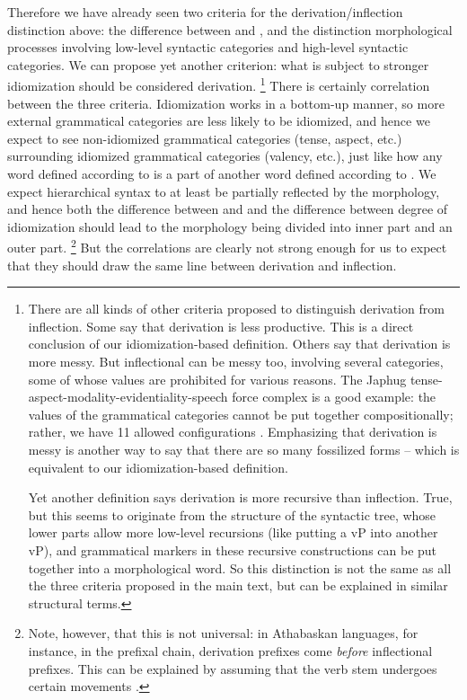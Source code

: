\documentclass[a4paper, oneside, scheme=plain, 12pt]{article}
\newcommand*{\citepage}[1]{p.~{#1}}
\begin{document}
Therefore we have already seen two criteria for the derivation/inflection distinction above:
the difference between  and ,
and the distinction morphological processes involving low-level syntactic categories and high-level syntactic categories.
We can propose yet another criterion:
what is subject to stronger idiomization should be considered derivation.%
\footnote{
    There are all kinds of other criteria proposed to distinguish derivation from inflection.
    Some say that derivation is less productive.
    This is a direct conclusion of our idiomization-based definition.
    Others say that derivation is more messy.
    But inflectional can be messy too,
    involving several categories, some of whose values are prohibited for various reasons.
    The Japhug tense-aspect-modality-evidentiality-speech force complex is a good example:
    the values of the grammatical categories cannot be put together compositionally;
    rather, we have 11 allowed configurations \citep[\citepage{1082}]{jacques2021grammar}.
    Emphasizing that derivation is messy is another way to say that there are so many fossilized forms --
    which is equivalent to our idiomization-based definition.
    
    Yet another definition says derivation is more recursive than inflection.
    True, but this seems to originate from the structure of the syntactic tree,
    whose lower parts allow more low-level recursions (like putting a vP into another vP),
    and grammatical markers in these recursive constructions can be put together into a morphological word.
    So this distinction is not the same as all the three criteria proposed in the main text,
    but can be explained in similar structural terms.
}
There is certainly correlation between the three criteria.
Idiomization works in a bottom-up manner,
so more external grammatical categories are less likely to be idiomized,
and hence we expect to see non-idiomized grammatical categories (tense, aspect, etc.)
surrounding idiomized grammatical categories (valency, etc.),
just like how any word defined according to 
is a part of another word defined according to .
We expect hierarchical syntax to at least be partially reflected by the morphology,
and hence both the difference between  and 
and the difference between degree of idiomization
should lead to the morphology being divided into inner part and an outer part.%
\footnote{
    Note, however, that this is not universal:
    in Athabaskan languages, for instance, in the prefixal chain,
    derivation prefixes come \emph{before} inflectional prefixes.
    This can be explained by assuming that the verb stem undergoes certain movements
    \citep[\citepage{78}]{rice2000athapaskan}.
}
But the correlations are clearly not strong enough for us to expect that they should draw the same line between derivation and inflection.
\end{document}
